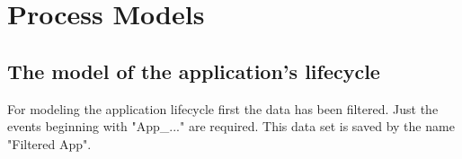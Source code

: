 \section*{Process Models}

\subsection*{The model of the application's lifecycle}
For modeling the application lifecycle first the data has been filtered. Just the events beginning with "App\_..." are required. This data set is saved by the name "Filtered App". 


